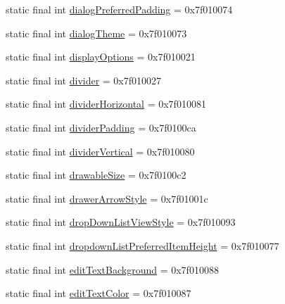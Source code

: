 \begin{CompactItemize}
\item 
static final int \hyperlink{classandroid_1_1support_1_1graphics_1_1drawable_1_1_r_1_1attr_555c497c9b2f1bdf88a241f75a4ac4d6}{dialogPreferredPadding} = 0x7f010074
\item 
static final int \hyperlink{classandroid_1_1support_1_1graphics_1_1drawable_1_1_r_1_1attr_9816ec1c601a1df93709054d5c37bc57}{dialogTheme} = 0x7f010073
\item 
static final int \hyperlink{classandroid_1_1support_1_1graphics_1_1drawable_1_1_r_1_1attr_097f585b677683cf9ac9af0f4fdc3024}{displayOptions} = 0x7f010021
\item 
static final int \hyperlink{classandroid_1_1support_1_1graphics_1_1drawable_1_1_r_1_1attr_44eb4c4af915732591b6a6c62dae8cbe}{divider} = 0x7f010027
\item 
static final int \hyperlink{classandroid_1_1support_1_1graphics_1_1drawable_1_1_r_1_1attr_e816e756073f977d79f5af5d97d1d081}{dividerHorizontal} = 0x7f010081
\item 
static final int \hyperlink{classandroid_1_1support_1_1graphics_1_1drawable_1_1_r_1_1attr_cd07295d36c6c938327fbe2bff718016}{dividerPadding} = 0x7f0100ca
\item 
static final int \hyperlink{classandroid_1_1support_1_1graphics_1_1drawable_1_1_r_1_1attr_d61c186b9bac12132827b67e8681b761}{dividerVertical} = 0x7f010080
\item 
static final int \hyperlink{classandroid_1_1support_1_1graphics_1_1drawable_1_1_r_1_1attr_7559edb353305fa15a0e5389bf82f7bb}{drawableSize} = 0x7f0100c2
\item 
static final int \hyperlink{classandroid_1_1support_1_1graphics_1_1drawable_1_1_r_1_1attr_6f610594eba910b07a9eb35d0f4ced72}{drawerArrowStyle} = 0x7f01001c
\item 
static final int \hyperlink{classandroid_1_1support_1_1graphics_1_1drawable_1_1_r_1_1attr_0102e00a3401d498ed9a67e02c07e9c9}{dropDownListViewStyle} = 0x7f010093
\item 
static final int \hyperlink{classandroid_1_1support_1_1graphics_1_1drawable_1_1_r_1_1attr_2ba99b91ae78faad98f3e24ad3071bbf}{dropdownListPreferredItemHeight} = 0x7f010077
\item 
static final int \hyperlink{classandroid_1_1support_1_1graphics_1_1drawable_1_1_r_1_1attr_a72b113fafacba3df3d3dcd5f2f5f7d5}{editTextBackground} = 0x7f010088
\item 
static final int \hyperlink{classandroid_1_1support_1_1graphics_1_1drawable_1_1_r_1_1attr_b44f5d38e2c21f1802026a90712c8b11}{editTextColor} = 0x7f010087

\end{CompactItemize}
